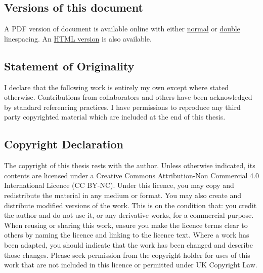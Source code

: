 \subsection*{Versions of this document}
A PDF version of document is available online with either \href{https://github.com/TomHodson/Thesis/raw/main/thesis.pdf}{normal} or \href{https://github.com/TomHodson/Thesis/raw/main/double_line_spaced.pdf}{double} linespacing. An \href{http://thomashodson.com/thesis/}{HTML version} is also available.


\subsection*{Statement of Originality}
I declare that the following work is entirely my own except where stated otherwise. Contributions from collaborators and others have been acknowledged by standard referencing practices. I have permissions to reproduce any third party copyrighted material which are included at the end of this thesis.

\subsection*{Copyright Declaration}
The copyright of this thesis rests with the author. Unless otherwise indicated, its contents are licensed under a Creative Commons Attribution-Non Commercial 4.0 International Licence (CC BY-NC). Under this licence, you may copy and redistribute the material in any medium or format. You may also create and distribute modified versions of the work. This is on the condition that: you credit the author and do not use it, or any derivative works, for a commercial purpose. When reusing or sharing this work, ensure you make the licence terms clear to others by naming the licence and linking to the licence text. Where a work has been adapted, you should indicate that the work has been changed and describe those changes. Please seek permission from the copyright holder for uses of this work that are not included in this licence or permitted under UK Copyright Law.